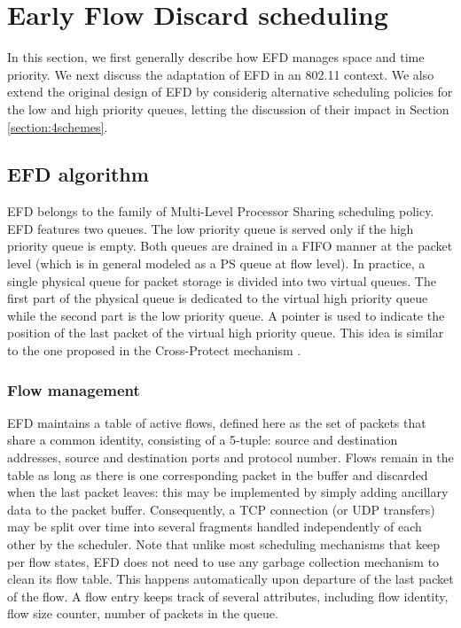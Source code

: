 \documentclass[preprint,12pt]{elsarticle}
\begin{document}
\section{Early Flow Discard scheduling}
\label{sec:efd_alg}

In this section, we first generally describe how EFD manages space and time priority. We next discuss the adaptation of EFD in an 802.11 context. We also extend the original design of EFD by considerig alternative scheduling policies for the low and high priority queues, letting the discussion of their impact in Section \ref{section:4schemes}. 

\subsection{EFD algorithm}
EFD belongs to the family of Multi-Level Processor Sharing scheduling policy. EFD features two queues. The low priority queue is served only if the high priority queue is empty. Both queues are drained in a FIFO manner at the packet level (which is in general modeled as a PS queue at flow level). In practice, a single physical queue for packet storage is divided into two virtual queues. The first part of the physical queue is dedicated to the virtual high priority queue while the second part is the low priority queue. A pointer is used to indicate the position of the last packet of the virtual high priority queue. This idea is similar to the one proposed in the Cross-Protect mechanism \cite{Kortebi04Xprotect}. %

\subsubsection{Flow management}
EFD maintains a table of active flows, defined here as the set of packets that share a common identity, consisting of a 5-tuple: source and destination addresses, source and destination ports and protocol number. Flows remain in the table as long as there is one corresponding packet in the buffer and discarded when the last packet leaves: this may be implemented by simply adding ancillary data to the packet buffer. Consequently, a TCP connection (or UDP transfers) may be split over time into several fragments handled independently of each other by the scheduler. Note that unlike most scheduling mechanisms that keep per flow states, EFD does not need to use any garbage collection mechanism to clean its flow table. This happens automatically upon departure of the last packet of the flow. A flow entry keeps track of several attributes, including flow identity, flow size counter, number of packets in the queue. %
\end{document}
